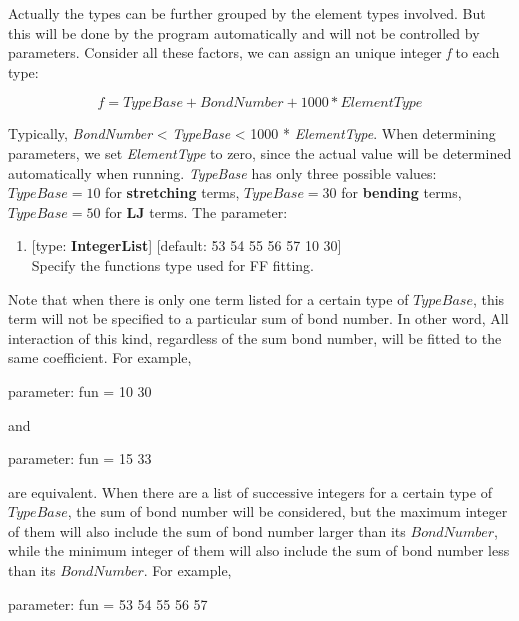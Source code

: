 \documentclass[11pt]{book}
\begin{document}
Actually the types can be further grouped by the element types involved. But this will be done by the program automatically and will not be 
controlled by parameters. Consider all these factors, we can assign an unique integer \emph{f} to each type:

\begin{equation}
f = TypeBase + BondNumber + 1000 * ElementType
\end{equation}

Typically, \emph{BondNumber} < \emph{TypeBase} < 1000 * \emph{ElementType}. When determining parameters, we set \emph{ElementType} to zero, since 
the actual value will be determined automatically when running. \emph{TypeBase} has only three possible values: $TypeBase = 10$ for  \textbf{stretching} terms, 
$TypeBase = 30$ for \textbf{bending} terms, $TypeBase = 50$ for \textbf{LJ} terms. The parameter:

\begin{enumerate}
	\item {} [type: \textbf{IntegerList}] [default: 53 54 55 56 57 10 30] \\
		Specify the functions type used for FF fitting.
\end{enumerate}

Note that when there is only one term listed for a certain type of $TypeBase$, this term will not be specified to a particular sum of bond number. 
In other word, All interaction of this kind, regardless of the sum bond number, will be fitted to the same coefficient. For example, 

\begin{everbatim}
{ parameter: fun = 10 30 }
\end{everbatim}

and 

\begin{everbatim}
{ parameter: fun = 15 33 }
\end{everbatim}

are equivalent. When there are a list of successive integers for a certain type of $TypeBase$, the sum of bond number will be considered, but the maximum 
integer of them will also include the sum of bond number larger than its $BondNumber$, while the minimum integer of them will also include the sum of 
bond number less than its $BondNumber$. For example,

\begin{everbatim}
{ parameter: fun = 53 54 55 56 57 }
\end{everbatim}
\end{document}
